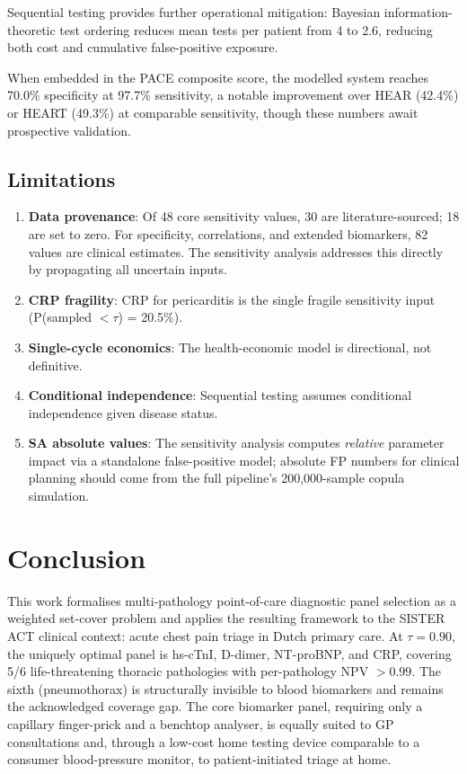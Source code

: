 \documentclass[11pt, oneside]{article}
\begin{document}
Sequential testing provides further operational mitigation: Bayesian information-theoretic test ordering reduces mean tests per patient from 4 to 2.6, reducing both cost and cumulative false-positive exposure.

When embedded in the PACE composite score, the modelled system reaches 70.0\% specificity at 97.7\% sensitivity, a notable improvement over HEAR (42.4\%) or HEART (49.3\%) at comparable sensitivity, though these numbers await prospective validation.

\subsection{Limitations}

\begin{enumerate}
\item \textbf{Data provenance}: Of 48 core sensitivity values, 30 are literature-sourced; 18 are set to zero. For specificity, correlations, and extended biomarkers, 82 values are clinical estimates. The sensitivity analysis addresses this directly by propagating all uncertain inputs.
\item \textbf{CRP fragility}: CRP for pericarditis is the single fragile sensitivity input (P(sampled $< \tau$) = 20.5\%).
\item \textbf{Single-cycle economics}: The health-economic model is directional, not definitive.
\item \textbf{Conditional independence}: Sequential testing assumes conditional independence given disease status.
\item \textbf{SA absolute values}: The sensitivity analysis computes \emph{relative} parameter impact via a standalone false-positive model; absolute FP numbers for clinical planning should come from the full pipeline's 200{,}000-sample copula simulation.
\end{enumerate}


\section{Conclusion}
\label{sec:conclusion}

This work formalises multi-pathology point-of-care diagnostic panel selection as a weighted set-cover problem and applies the resulting framework to the SISTER ACT clinical context: acute chest pain triage in Dutch primary care. At $\tau = 0.90$, the uniquely optimal panel is hs-cTnI, D-dimer, NT-proBNP, and CRP, covering 5/6 life-threatening thoracic pathologies with per-pathology NPV $> 0.99$. The sixth (pneumothorax) is structurally invisible to blood biomarkers and remains the acknowledged coverage gap. The core biomarker panel, requiring only a capillary finger-prick and a benchtop analyser, is equally suited to GP consultations and, through a low-cost home testing device comparable to a consumer blood-pressure monitor, to patient-initiated triage at home.
\end{document}
